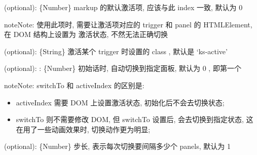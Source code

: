 \documentclass[letterpaper,10pt,english]{sphinxmanual}
\begin{document}

\begin{fulllineitems}
\label{api/component/switchable/switchable:Switchable.Switchable.activeIndex}
(optional): \{Number\} markup 的默认激活项, 应该与此 index 一致, 默认为 0

\begin{notice}{note}{Note:}
使用此项时, 需要让激活项对应的 trigger 和 panel 的 HTMLElement, 在 DOM 结构上设置为 激活状态, 不然无法正确切换
\end{notice}

\end{fulllineitems}



\begin{fulllineitems}
\label{api/component/switchable/switchable:Switchable.Switchable.activeTriggerCls}
(optional): \{String\} 激活某个 trigger 时设置的 class , 默认是 `ks-active'

\end{fulllineitems}



\begin{fulllineitems}
\label{api/component/switchable/switchable:Switchable.Switchable.switchTo}
(optional): : \{Number\} 初始话时, 自动切换到指定面板, 默认为 0 , 即第一个

\begin{notice}{note}{Note:}
switchTo 和 activeIndex 的区别是:
\begin{itemize}
\item {}
activeIndex 需要 DOM 上设置激活状态, 初始化后不会去切换状态;

\item {}
switchTo 则不需要修改 DOM, 但 switchTo 设置后, 会去切换到指定状态, 这在用了一些动画效果时, 切换动作更为明显;

\end{itemize}
\end{notice}

\end{fulllineitems}



\begin{fulllineitems}
\label{api/component/switchable/switchable:Switchable.Switchable.steps}
(optional): \{Number\} 步长, 表示每次切换要间隔多少个 panels, 默认为 1

\end{fulllineitems}
\end{document}
